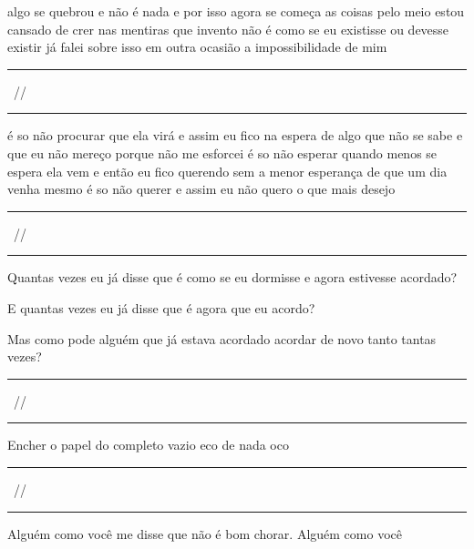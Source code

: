 \begin{poem}
\begin{stanza}
algo se quebrou\verseline
e não é nada\verseline
e por isso agora se começa\verseline
as coisas pelo meio\verseline
estou cansado de crer\verseline
nas mentiras que invento\verseline
não é como se eu existisse\verseline
ou devesse existir\verseline
já falei sobre isso\verseline
em outra ocasião\verseline
a impossibilidade de mim
\end{stanza}
\begin{stanza}
\rule{1cm}{0.4pt}\ \tiny{//}\ \rule{1cm}{0.4pt}
\end{stanza}
\begin{stanza}
é so não procurar\verseline
que ela virá\verseline
e assim eu fico na espera\verseline
de algo que não se sabe\verseline
e que eu não mereço\verseline
porque não me esforcei\verseline
é so não esperar\verseline
quando menos se espera\verseline
ela vem\verseline
e então eu fico querendo\verseline
sem a menor esperança\verseline
de que um dia venha mesmo\verseline
é so não querer\verseline
e assim eu não quero\verseline
o que mais desejo
\end{stanza}
\begin{stanza}
\rule{1cm}{0.4pt}\ \tiny{//}\ \rule{1cm}{0.4pt}
\end{stanza}
\begin{stanza}
Quantas vezes eu já disse\verseline
que é como se eu dormisse\verseline
e agora\verseline
estivesse acordado?
\end{stanza}
\begin{stanza}
E quantas vezes eu já disse\verseline
que é agora que eu acordo?
\end{stanza}
\begin{stanza}
Mas como pode alguém\verseline
que já estava acordado\verseline
acordar de novo tanto\verseline
tantas vezes?
\end{stanza}
\begin{stanza}
\rule{1cm}{0.4pt}\ \tiny{//}\ \rule{1cm}{0.4pt}
\end{stanza}
\begin{stanza}
Encher o papel do completo vazio\verseline
eco de nada\verseline
oco
\end{stanza}
\begin{stanza}
\rule{1cm}{0.4pt}\ \tiny{//}\ \rule{1cm}{0.4pt}
\end{stanza}
\begin{stanza}
Alguém como você me disse que não é bom\verseline
chorar.\verseline
Alguém como você\verseline

\end{stanza}
\end{poem}
